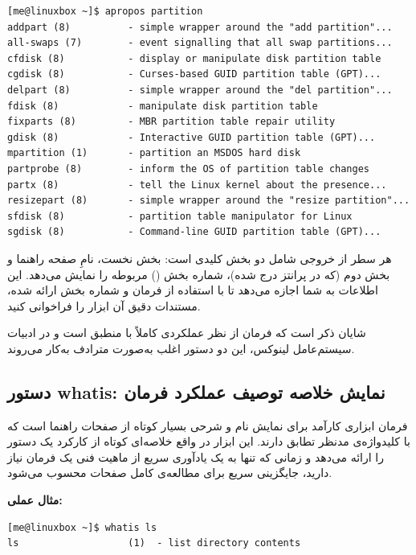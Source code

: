 \begin{latin}
\begin{lstlisting}
[me@linuxbox ~]$ apropos partition
addpart (8)          - simple wrapper around the "add partition"...
all-swaps (7)        - event signalling that all swap partitions...
cfdisk (8)           - display or manipulate disk partition table
cgdisk (8)           - Curses-based GUID partition table (GPT)...
delpart (8)          - simple wrapper around the "del partition"...
fdisk (8)            - manipulate disk partition table
fixparts (8)         - MBR partition table repair utility
gdisk (8)            - Interactive GUID partition table (GPT)...
mpartition (1)       - partition an MSDOS hard disk
partprobe (8)        - inform the OS of partition table changes
partx (8)            - tell the Linux kernel about the presence...
resizepart (8)       - simple wrapper around the "resize partition"...
sfdisk (8)           - partition table manipulator for Linux
sgdisk (8)           - Command-line GUID partition table (GPT)...
\end{lstlisting}
\end{latin}

هر سطر از خروجی شامل دو بخش کلیدی است: بخش نخست، نامِ صفحه راهنما و بخش دوم (که در پرانتز درج شده)، شماره بخش () مربوطه را نمایش می‌دهد. این اطلاعات به شما اجازه می‌دهد تا با استفاده از فرمان  و شماره بخش ارائه شده، مستندات دقیق آن ابزار را فراخوانی کنید.

شایان ذکر است که فرمان  از نظر عملکردی کاملاً با  منطبق است و در ادبیات سیستم‌عامل لینوکس، این دو دستور اغلب به‌صورت مترادف به‌کار می‌روند.

\subsection{دستور whatis: نمایش خلاصه توصیف عملکرد فرمان}

فرمان  ابزاری کارآمد برای نمایش نام و شرحی بسیار کوتاه از صفحات راهنما است که با کلیدواژه‌ی مدنظر تطابق دارند. این ابزار در واقع خلاصه‌ای کوتاه از کارکرد یک دستور را ارائه می‌دهد و زمانی که تنها به یک یادآوری سریع از ماهیت فنی یک فرمان نیاز دارید، جایگزینی سریع برای مطالعه‌ی کامل صفحات  محسوب می‌شود.

\textbf{مثال عملی:}

\begin{latin}
\begin{lstlisting}
[me@linuxbox ~]$ whatis ls
ls                   (1)  - list directory contents
\end{lstlisting}
\end{latin}

